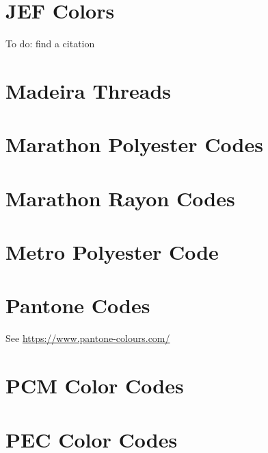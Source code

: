\documentclass[11pt]{report}
\begin{document}
%

\section{JEF Colors}

To do: find a citation

%

\section{Madeira Threads}

%

%

\section{Marathon Polyester Codes}

%

\section{Marathon Rayon Codes}

%

\section{Metro Polyester Code}

%

\section{Pantone Codes}

See \url{https://www.pantone-colours.com/}

%

\section{PCM Color Codes}

%

\section{PEC Color Codes}
\end{document}
